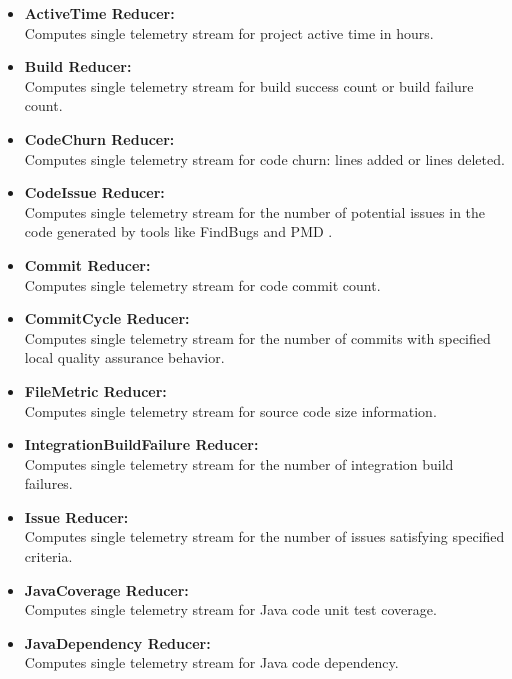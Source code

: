 \begin{itemize}  
	\item \textbf{ActiveTime Reducer:}\\ 
Computes single telemetry stream for project active time in hours.
    
	\item \textbf{Build Reducer:}\\
Computes single telemetry stream for build success count or build failure count.

	\item \textbf{CodeChurn Reducer:}\\
Computes single telemetry stream for code churn: lines added or lines deleted.

	\item \textbf{CodeIssue Reducer:}\\
Computes single telemetry stream for the number of potential issues in the code generated by tools like FindBugs \cite{Software:FindBugs} and PMD \cite{Software:PMD}.

	\item \textbf{Commit Reducer:}\\
Computes single telemetry stream for code commit count.

	\item \textbf{CommitCycle Reducer:}\\
Computes single telemetry stream for the number of commits with specified local quality assurance behavior.

	\item \textbf{FileMetric Reducer:}\\
Computes single telemetry stream for source code size information.

	\item \textbf{IntegrationBuildFailure Reducer:}\\
Computes single telemetry stream for the number of integration build failures.

	\item \textbf{Issue Reducer:}\\
Computes single telemetry stream for the number of issues satisfying specified criteria.

	\item \textbf{JavaCoverage Reducer:}\\
Computes single telemetry stream for Java code unit test coverage.

	\item \textbf{JavaDependency Reducer:}\\
Computes single telemetry stream for Java code dependency.


\end{itemize}
